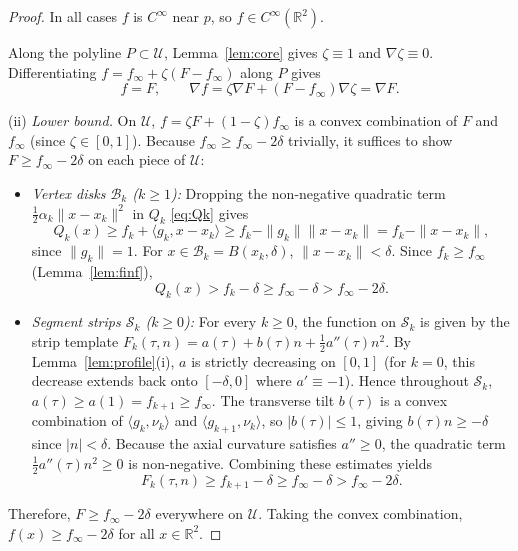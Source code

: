 \documentclass[11pt]{article}
\newcommand{\R}{\mathbb{R}}
\newcommand{\ip}[2]{\langle #1,#2\rangle}
\begin{document}
\begin{proof}
In all cases $f$ is $C^\infty$ near $p$, so $f\in C^\infty(\R^2)$.

Along the polyline $P \subset \mathcal U$, Lemma~\ref{lem:core} gives $\zeta \equiv 1$ and $\nabla\zeta \equiv 0$.
Differentiating $f = f_\infty + \zeta(F - f_\infty)$ along $P$ gives
\[
f = F, \qquad \nabla f = \zeta\nabla F + (F - f_\infty)\nabla\zeta = \nabla F.
\]

(ii) \emph{Lower bound.}
On $\mathcal U$, $f = \zeta F + (1-\zeta)f_\infty$ is a convex combination of $F$ and $f_\infty$ (since $\zeta \in [0, 1]$).
Because $f_\infty \ge f_\infty - 2\delta$ trivially, it suffices to show $F \ge f_\infty - 2\delta$ on each piece of $\mathcal U$:
\begin{itemize}
\item \emph{Vertex disks $\mathcal B_k$ ($k\ge 1$):}
Dropping the non-negative quadratic term $\frac12\alpha_k\|x-x_k\|^2$ in $Q_k$ \eqref{eq:Qk} gives
\[
Q_k(x) \ge f_k + \ip{g_k}{x-x_k} \ge f_k - \|g_k\|\|x-x_k\| = f_k - \|x-x_k\|,
\]
since $\|g_k\| = 1$.
For $x \in \mathcal B_k = B(x_k, \delta)$, $\|x-x_k\| < \delta$.
Since $f_k \ge f_\infty$ (Lemma~\ref{lem:finf}),
\[
Q_k(x) > f_k - \delta \ge f_\infty - \delta > f_\infty - 2\delta.
\]

\item \emph{Segment strips $\mathcal S_k$ ($k\ge 0$):}
For every $k\ge 0$, the function on $\mathcal S_k$ is given by the strip template $F_k(\tau, n) = a(\tau) + b(\tau)n + \frac12 a''(\tau)n^2$.
By Lemma~\ref{lem:profile}(i), $a$ is strictly decreasing on $[0, 1]$ (for $k=0$, this decrease extends back onto $[-\delta, 0]$ where $a' \equiv -1$).
Hence throughout $\mathcal S_k$, $a(\tau) \ge a(1) = f_{k+1} \ge f_\infty$.
The transverse tilt $b(\tau)$ is a convex combination of $\ip{g_k}{\nu_k}$ and $\ip{g_{k+1}}{\nu_k}$, so $|b(\tau)| \le 1$, giving $b(\tau)n \ge -\delta$ since $|n| < \delta$.
Because the axial curvature satisfies $a'' \ge 0$, the quadratic term $\frac12 a''(\tau)n^2 \ge 0$ is non-negative.
Combining these estimates yields
\[
F_k(\tau, n) \ge f_{k+1} - \delta \ge f_\infty - \delta > f_\infty - 2\delta.
\]
\end{itemize}
Therefore, $F \ge f_\infty - 2\delta$ everywhere on $\mathcal U$.
Taking the convex combination, $f(x) \ge f_\infty - 2\delta$ for all $x \in \R^2$.


\end{proof}
\end{document}
